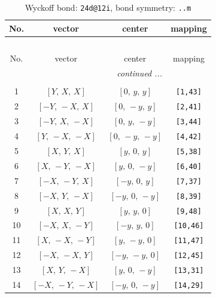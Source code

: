\documentclass[fleqn,8pt]{jsarticle}
\begin{document}
\begin{longtable}{cccc}
\caption{Wyckoff bond: {\tt 24d@12i}, bond symmetry: {\tt ..m}}
 \\
 \hline \hline
No. & vector & center & mapping \\ \hline \endfirsthead

\multicolumn{3}{l}{\tablename\ \thetable{}} \\
 \hline \hline
No. & vector & center & mapping \\ \hline \endhead

 \hline \hline
\multicolumn{3}{r}{\footnotesize\it continued ...} \\ \endfoot

 \hline \hline
\multicolumn{3}{r}{} \\ \endlastfoot

1 & $\left[ Y,\, X,\, X \right]$ & $\left[ 0,\, y,\, y \right]$ & {\tt [1,43]} \\ \hline
2 & $\left[ - Y,\, - X,\, X \right]$ & $\left[ 0,\, - y,\, y \right]$ & {\tt [2,41]} \\ \hline
3 & $\left[ - Y,\, X,\, - X \right]$ & $\left[ 0,\, y,\, - y \right]$ & {\tt [3,44]} \\ \hline
4 & $\left[ Y,\, - X,\, - X \right]$ & $\left[ 0,\, - y,\, - y \right]$ & {\tt [4,42]} \\ \hline
5 & $\left[ X,\, Y,\, X \right]$ & $\left[ y,\, 0,\, y \right]$ & {\tt [5,38]} \\ \hline
6 & $\left[ X,\, - Y,\, - X \right]$ & $\left[ y,\, 0,\, - y \right]$ & {\tt [6,40]} \\ \hline
7 & $\left[ - X,\, - Y,\, X \right]$ & $\left[ - y,\, 0,\, y \right]$ & {\tt [7,37]} \\ \hline
8 & $\left[ - X,\, Y,\, - X \right]$ & $\left[ - y,\, 0,\, - y \right]$ & {\tt [8,39]} \\ \hline
9 & $\left[ X,\, X,\, Y \right]$ & $\left[ y,\, y,\, 0 \right]$ & {\tt [9,48]} \\ \hline
10 & $\left[ - X,\, X,\, - Y \right]$ & $\left[ - y,\, y,\, 0 \right]$ & {\tt [10,46]} \\ \hline
11 & $\left[ X,\, - X,\, - Y \right]$ & $\left[ y,\, - y,\, 0 \right]$ & {\tt [11,47]} \\ \hline
12 & $\left[ - X,\, - X,\, Y \right]$ & $\left[ - y,\, - y,\, 0 \right]$ & {\tt [12,45]} \\ \hline
13 & $\left[ X,\, Y,\, - X \right]$ & $\left[ y,\, 0,\, - y \right]$ & {\tt [13,31]} \\ \hline
14 & $\left[ - X,\, - Y,\, - X \right]$ & $\left[ - y,\, 0,\, - y \right]$ & {\tt [14,29]} \\ \hline

\end{longtable}
\end{document}
